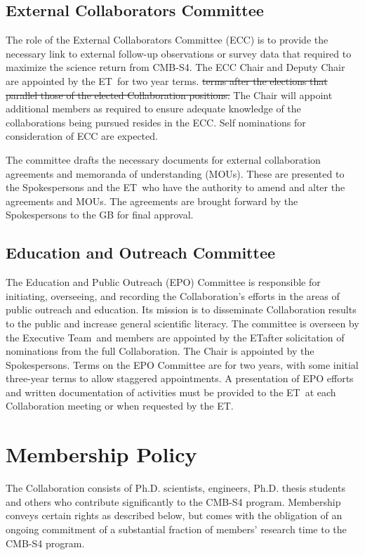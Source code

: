\documentclass[12pt]{article}
\newcommand{\Comment}[1]{\textcolor{Blue}{(Comment: #1)}}
\newcommand{\exec}{{Executive Team}}
\newcommand{\shorte}{{ET}}  %
\begin{document}
\subsection{External Collaborators Committee}

The role of the External Collaborators Committee (ECC) is to provide the necessary link to external follow-up observations or survey data that required to maximize the science return from CMB-S4. The ECC Chair and Deputy Chair are appointed by the \shorte\ for two year terms. {\color{red} \sout{terms after the elections that parallel those of the elected Collaboration positions. }}
The Chair will appoint additional members as required to ensure adequate knowledge of the collaborations being pursued resides in the ECC. Self nominations for consideration of ECC are expected. 

The committee drafts the necessary documents for external collaboration agreements and memoranda of understanding (MOUs). These are presented to the Spokespersons and the \shorte\ who have the authority to amend and alter the agreements and MOUs. The agreements are brought forward by the Spokespersons to the GB for final approval. %

\subsection{Education and Outreach Committee}

The Education and Public Outreach (EPO) Committee is responsible for initiating, overseeing, and recording the Collaboration's efforts in the areas of public outreach and education. Its mission is to disseminate Collaboration results to the public and increase general scientific literacy. The committee is overseen by the \exec \ and members are appointed by the \shorte after solicitation of nominations from the full Collaboration. The Chair is appointed by the Spokespersons. Terms on the EPO Committee are for two years, with some initial three-year terms to allow staggered appointments.   A presentation of EPO efforts and written documentation of activities must be provided to the \shorte\ at each Collaboration meeting or when requested by the \shorte. 

\section{Membership Policy}

The Collaboration consists of Ph.D. scientists, engineers, Ph.D. thesis students %
and others who contribute significantly to the CMB-S4 program. Membership conveys certain rights as described below, but comes with the obligation of an ongoing commitment of a substantial fraction of members' research time to the CMB-S4 program.
\end{document}
